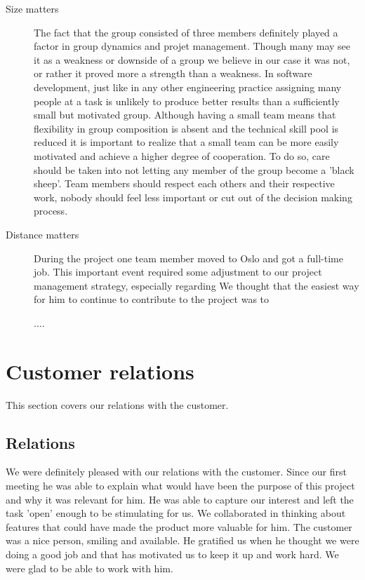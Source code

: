 \begin{description}
\item[Size matters]
The fact that the group consisted of three members definitely played a factor in group dynamics
and projet management. Though many may see it as a weakness or downside of a group we believe
in our case it was not, or rather it proved more a strength than a weakness.
In software development, just like in any other engineering practice assigning many people
at a task is unlikely to produce better results than a sufficiently small but motivated group.
Although having a small team means that flexibility in group composition is absent and
the technical skill pool is reduced it is important to realize that a small team
can be more easily motivated and achieve a higher degree of cooperation.
To do so, care should be taken into not letting any member of the group become
a 'black sheep'. Team members should respect each others and their respective work,
nobody should feel less important or cut out of the decision making process.

\item[Distance matters]
During the project one team member moved to Oslo and got a full-time job.
This important event required some adjustment to our project management strategy,
especially regarding
We thought that the easiest way for him to continue to contribute to the project
was to 

....



\end{description}







\section{Customer relations}
This section covers our relations with the customer.

\subsection{Relations}
We were definitely pleased with our relations with the customer.
Since our first meeting he was able to explain what would have been the purpose of this project and why
it was relevant for him. He was able to capture our interest and left the task 'open' enough to be stimulating for us.
We collaborated in thinking about features that could have made the product more valuable for him.
The customer was a nice person, smiling and available.
He gratified us when he thought we were doing a good job and
that has motivated us to keep it up and work hard. We were glad to be able to work with him.

